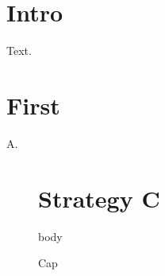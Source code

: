 \documentclass{report}
\begin{document}
\chapter{Intro} Text.
\appendix
\chapter{First} A.
\begin{figure}\chapter*{Strategy C} body \caption{Cap}\end{figure}
\end{document}
